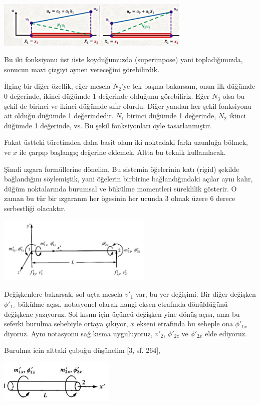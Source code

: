 \documentclass[12pt,fleqn]{article}\usepackage{../../common}
\begin{document}
\includegraphics[width=25em]{compscieng_bpp45fem2_08.jpg}

Bu iki fonksiyonu üst üste koyduğumuzda (superimpose) yani topladığımızda,
sonucun mavi çizgiyi aynen vereceğini görebilirdik.

İlginç bir diğer özellik, eğer mesela $N_2$'ye tek başına bakarsam, onun ilk
düğümde 0 değerinde, ikinci düğümde 1 değerinde olduğunu görebiliriz.  Eğer
$N_3$ olsa bu şekil de birinci ve ikinci düğümde sıfır olurdu. Diğer yandan her
şekil fonksiyonu ait olduğu düğümde 1 değerindedir. $N_1$ birinci düğümde 1
değerinde, $N_2$ ikinci düğümde 1 değerinde, vs. Bu şekil fonksiyonları öyle
tasarlanmıştır.

Fakat üstteki türetimden daha basit olanı iki noktadaki farkı uzunluğa bölmek,
ve $x$ ile çarpıp başlangıç değerine eklemek. Altta bu teknik kullanılacak.

Şimdi ızgara formüllerine dönelim. Bu sistemin öğelerinin katı (rigid) şekilde
bağlandığını söylemiştik, yani öğelerin birbirine bağlandığındaki açılar aynı
kalır, düğüm noktalarında burumsal ve bükülme momentleri süreklilik gösterir. O
zaman bu tür bir ızgaranın her ögesinin her ucunda 3 olmak üzere 6 derece
serbestliği olacaktır.

\includegraphics[width=20em]{compscieng_bpp43fem_04.jpg}

Değişkenlere bakarsak, sol uçta mesela $v'_1$ var, bu yer değişimi.  Bir diğer
değişken $\phi'_{1z}$ bükülme açısı, notasyonel olarak hangi eksen etrafında
dönüldüğünü değişkene yazıyoruz. Sol kısım için üçüncü değişken yine dönüş
açısı, ama bu seferki burulma sebebiyle ortaya çıkıyor, $x$ ekseni etrafında bu
sebeple ona $\phi'_{1x}$ diyoruz. Aynı notasyonu sağ kısma uyguluyoruz, $v'_2$,
$\phi'_{2z}$ ve $\phi'_{2x}$ elde ediyoruz.

Burulma icin alttaki çubuğu düşünelim [3, sf. 264],

\includegraphics[width=15em]{compscieng_bpp43fem_02.jpg}
\end{document}
